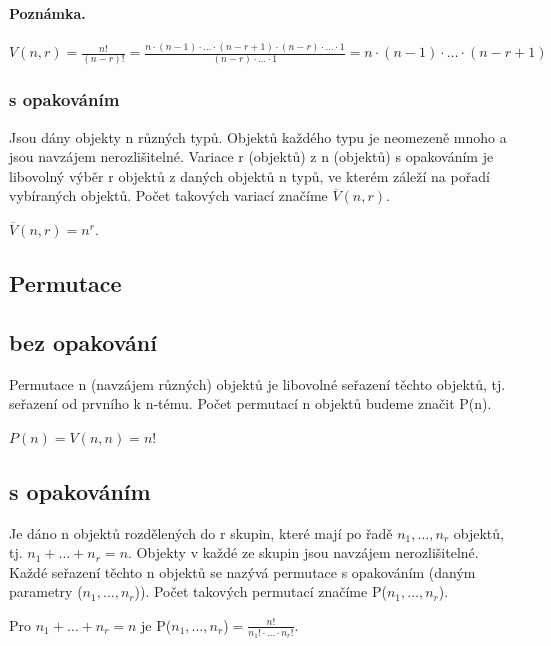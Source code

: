 \paragraph{Poznámka.} $V(n, r) = \frac{n!}{(n - r)!} = \frac{n \cdot (n - 1) \cdot \dots \cdot (n - r + 1) \cdot (n - r) \cdot \dots \cdot 1}{(n - r) \cdot \dots \cdot 1} = n \cdot (n - 1) \cdot \dots \cdot (n - r + 1)$

\subsubsection{s opakováním}
\begin{definition}
	Jsou dány objekty n různých typů. Objektů každého typu je neomezeně mnoho a jsou navzájem nerozlišitelné. Variace r (objektů) z n (objektů) s opakováním je libovolný výběr r objektů z daných objektů n typů, ve kterém záleží na pořadí vybíraných objektů. Počet takových variací značíme $\overline{V}(n, r)$.	
\end{definition}
\begin{sentence}
	$\overline{V}(n, r) = n^r$.
\end{sentence}

\subsection{Permutace}
\subsection{bez opakování}
\begin{definition}
	Permutace n (navzájem různých) objektů je libovolné seřazení těchto objektů, tj. seřazení od prvního k n-tému. Počet permutací n objektů budeme značit P(n).
\end{definition}
\begin{sentence}
	$P(n) = V(n, n) = n!$
\end{sentence}

\subsection{s opakováním}
\begin{definition}
	Je dáno n objektů rozdělených do r skupin, které mají po řadě $n_1, \dots,n_r$ objektů, tj. $n_1 + \dots + n_r = n$. Objekty v každé ze skupin jsou navzájem nerozlišitelné. Každé seřazení těchto n objektů se nazývá permutace s opakováním (daným parametry ($n_1, \dots, n_r$)). Počet takových permutací značíme P($n_1, \dots, n_r$).
\end{definition}
\begin{sentence}
	Pro $n_1 + \dots + n_r = n$ je P($n_1, \dots, n_r$)$ = \frac{n!}{n_1! \cdot \dots \cdot n_r!}$.
\end{sentence}


